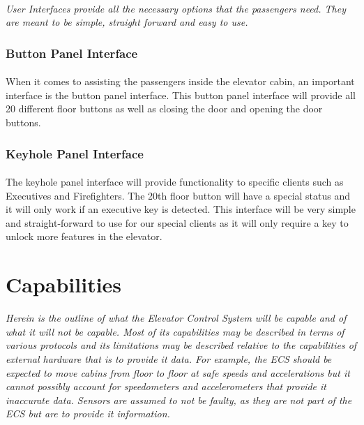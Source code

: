 \documentclass[12pt]{article}
\begin{document}
\paragraph{} \textit{User Interfaces provide all the necessary options that the passengers need.
They are meant to be simple, straight forward and easy to use.}
\subsubsection{Button Panel Interface}
\paragraph{} When it comes to assisting the passengers inside the elevator cabin, an important interface is the button panel interface. This button panel interface will provide all 20 different floor buttons as well as closing the door and opening the door buttons.
\subsubsection{Keyhole Panel Interface}
\paragraph{} The keyhole panel interface will provide functionality to specific clients such as Executives and Firefighters. The 20th floor button will have a special status and it will only work if an executive key is detected. This interface will be very simple and straight-forward to use for our special clients as it will only require a key to unlock more features in the elevator.


\section{Capabilities} %
\label{cap}
\textit{Herein is the outline of what the Elevator Control System will be capable and of what it will not be capable. Most of its capabilities may be described in terms of various protocols and its limitations may be described relative to the capabilities of external hardware that is to provide it data. For example, the \textit{ECS} should be expected to move cabins from floor to floor at safe speeds and accelerations but it cannot possibly account for speedometers and accelerometers that provide it inaccurate data. Sensors are assumed to not be faulty, as they are not part of the \textit{ECS} but are to provide it information.}
\end{document}

